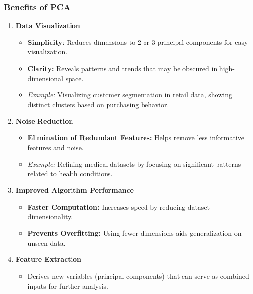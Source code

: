 \documentclass[aspectratio=169]{beamer}
\begin{document}
\begin{frame}[fragile]
    \frametitle{Benefits of PCA}
    \begin{enumerate}
        \item \textbf{Data Visualization}
            \begin{itemize}
                \item \textbf{Simplicity:} Reduces dimensions to 2 or 3 principal components for easy visualization.
                \item \textbf{Clarity:} Reveals patterns and trends that may be obscured in high-dimensional space.
                \item \textit{Example:} Visualizing customer segmentation in retail data, showing distinct clusters based on purchasing behavior.
            \end{itemize}
        
        \item \textbf{Noise Reduction}
            \begin{itemize}
                \item \textbf{Elimination of Redundant Features:} Helps remove less informative features and noise.
                \item \textit{Example:} Refining medical datasets by focusing on significant patterns related to health conditions.
            \end{itemize}

        \item \textbf{Improved Algorithm Performance}
            \begin{itemize}
                \item \textbf{Faster Computation:} Increases speed by reducing dataset dimensionality.
                \item \textbf{Prevents Overfitting:} Using fewer dimensions aids generalization on unseen data.
            \end{itemize}

        \item \textbf{Feature Extraction}
            \begin{itemize}
                \item Derives new variables (principal components) that can serve as combined inputs for further analysis.
            \end{itemize}
    \end{enumerate}
\end{frame}
\end{document}
